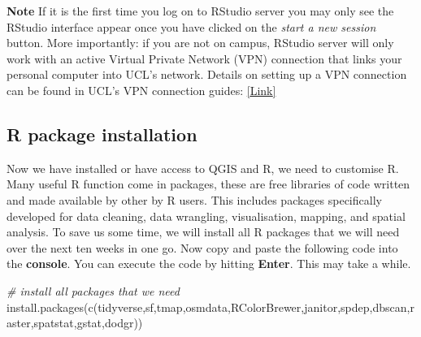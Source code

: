 \documentclass[
]{book}
\newenvironment{Shaded}{\begin{snugshade}}{\end{snugshade}}
\newcommand{\CommentTok}[1]{\textcolor[rgb]{0.56,0.35,0.01}{\textit{#1}}}
\newcommand{\FunctionTok}[1]{\textcolor[rgb]{0.00,0.00,0.00}{#1}}
\newcommand{\NormalTok}[1]{#1}
\newcommand{\StringTok}[1]{\textcolor[rgb]{0.31,0.60,0.02}{#1}}
\begin{document}
\textbf{Note}
If it is the first time you log on to RStudio server you may only see the RStudio interface appear once you have clicked on the \emph{start a new session} button. More importantly: if you are not on campus, RStudio server will only work with an active Virtual Private Network (VPN) connection that links your personal computer into UCL's network. Details on setting up a VPN connection can be found in UCL's VPN connection guides: \href{https://www.ucl.ac.uk/isd/services/get-connected/ucl-virtual-private-network-vpn}{{[}Link{]}}

\hypertarget{r-package-installation}{%
\subsection{R package installation}\label{r-package-installation}}

Now we have installed or have access to QGIS and R, we need to customise R. Many useful R function come in packages, these are free libraries of code written and made available by other by R users. This includes packages specifically developed for data cleaning, data wrangling, visualisation, mapping, and spatial analysis. To save us some time, we will install all R packages that we will need over the next ten weeks in one go. Now copy and paste the following code into the \textbf{console}. You can execute the code by hitting \textbf{Enter}. This may take a while.

\begin{Shaded}
\begin{Highlighting}[]
\CommentTok{\# install all packages that we need}
\FunctionTok{install.packages}\NormalTok{(}\FunctionTok{c}\NormalTok{(}\StringTok{\textquotesingle{}tidyverse\textquotesingle{}}\NormalTok{,}\StringTok{\textquotesingle{}sf\textquotesingle{}}\NormalTok{,}\StringTok{\textquotesingle{}tmap\textquotesingle{}}\NormalTok{,}\StringTok{\textquotesingle{}osmdata\textquotesingle{}}\NormalTok{,}\StringTok{\textquotesingle{}RColorBrewer\textquotesingle{}}\NormalTok{,}\StringTok{\textquotesingle{}janitor\textquotesingle{}}\NormalTok{,}\StringTok{\textquotesingle{}spdep\textquotesingle{}}\NormalTok{,}\StringTok{\textquotesingle{}dbscan\textquotesingle{}}\NormalTok{,}\StringTok{\textquotesingle{}raster\textquotesingle{}}\NormalTok{,}\StringTok{\textquotesingle{}spatstat\textquotesingle{}}\NormalTok{,}\StringTok{\textquotesingle{}gstat\textquotesingle{}}\NormalTok{,}\StringTok{\textquotesingle{}dodgr\textquotesingle{}}\NormalTok{))}
\end{Highlighting}
\end{Shaded}
\end{document}
